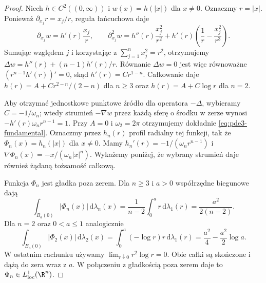 \begin{proof}
Niech $h\in C^2((0,\infty))$ i $w(x)=h(|x|)$
dla $x\ne0$. Oznaczmy $r=|x|$. Ponieważ
$\partial_{x_j}r=x_j/r$, reguła łańcuchowa daje
\[
 \partial_{x_j}w=h'(r)\frac{x_j}{r},\qquad
 \partial_{x_j}^2w
 =h''(r)\frac{x_j^2}{r^2}
 +h'(r)\left(\frac1r-\frac{x_j^2}{r^3}\right).
\]
Sumując względem $j$ i korzystając z
$\sum_{j=1}^n x_j^2=r^2$, otrzymujemy
$\Delta w=h''(r)+(n-1)h'(r)/r$.
Równanie $\Delta w=0$ jest więc równoważne
$(r^{n-1}h'(r))'=0$, skąd $h'(r)=Cr^{1-n}$.
Całkowanie daje $h(r)=A+Cr^{2-n}/(2-n)$ dla $n\geq3$
oraz $h(r)=A+C\log r$ dla $n=2$.

Aby otrzymać jednostkowe punktowe źródło dla operatora
$-\Delta$, wybieramy $C=-1/\omega_n$; wtedy strumień
$-\nabla w$ przez każdą sferę o środku w zerze wynosi
$-h'(r)\omega_n r^{n-1}=1$.
Przy $A=0$ i $\omega_2=2\pi$ otrzymujemy dokładnie
\eqref{eq:pde3-fundamental}. Oznaczmy przez $h_n(r)$
profil radialny tej funkcji, tak że
$\Phi_n(x)=h_n(|x|)$ dla $x\ne0$. Mamy
$h_n'(r)=-1/(\omega_n r^{n-1})$ i
$\nabla\Phi_n(x)=-x/(\omega_n |x|^n)$.
Wykażemy poniżej, że wybrany strumień daje również
żądaną tożsamość całkową.

Funkcja $\Phi_n$ jest gładka poza zerem.
Dla $n\geq3$ i $a>0$ współrzędne biegunowe dają
\[
 \int_{B_a(0)}|\Phi_n(x)|\,\mathrm d\lambda_n(x)
 =\frac1{n-2}\int_0^a r\,\mathrm d\lambda_1(r)
 =\frac{a^2}{2(n-2)}.
\]
Dla $n=2$ oraz $0<a\leq1$ analogicznie
\[
 \int_{B_a(0)}|\Phi_2(x)|\,\mathrm d\lambda_2(x)
 =\int_0^a(-\log r)r\,\mathrm d\lambda_1(r)
 =\frac{a^2}{4}-\frac{a^2}{2}\log a.
\]
W ostatnim rachunku używamy
$\lim_{r\downarrow0}r^2\log r=0$.
Obie całki są skończone i dążą do zera wraz z $a$.
W połączeniu z gładkością poza zerem daje to
$\Phi_n\in L^1_{\mathrm{loc}}(\R^n)$.


\end{proof}
